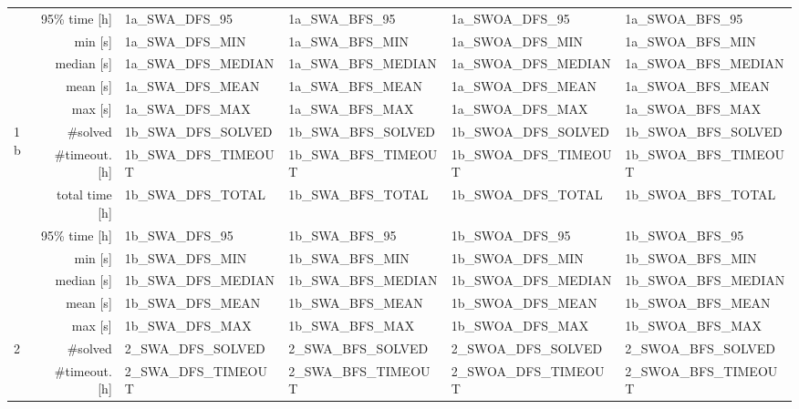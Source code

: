 \begin{table}
{{\begin{tabular}{|l|r|l|l|l|l|}
                      & 95\% time [h]  & 1a_SWA_DFS_95         & 1a_SWA_BFS_95         & 1a_SWOA_DFS_95        & 1a_SWOA_BFS_95         \\
\cline{2-6}
                      & min [s]        & 1a_SWA_DFS_MIN        & 1a_SWA_BFS_MIN        & 1a_SWOA_DFS_MIN       & 1a_SWOA_BFS_MIN        \\
                      & median [s]     & 1a_SWA_DFS_MEDIAN     & 1a_SWA_BFS_MEDIAN     & 1a_SWOA_DFS_MEDIAN    & 1a_SWOA_BFS_MEDIAN     \\
                      & mean [s]       & 1a_SWA_DFS_MEAN       & 1a_SWA_BFS_MEAN       & 1a_SWOA_DFS_MEAN      & 1a_SWOA_BFS_MEAN       \\
                      & max [s]        & 1a_SWA_DFS_MAX        & 1a_SWA_BFS_MAX        & 1a_SWOA_DFS_MAX       & 1a_SWOA_BFS_MAX        \\
\hline
\hline
\multirow{8}{*}{1b}   & \#solved & 1b_SWA_DFS_SOLVED    & 1b_SWA_BFS_SOLVED    & 1b_SWOA_DFS_SOLVED   & 1b_SWOA_BFS_SOLVED    \\
                      & \#timeout. [h] & 1b_SWA_DFS_TIMEOUT    & 1b_SWA_BFS_TIMEOUT    & 1b_SWOA_DFS_TIMEOUT   & 1b_SWOA_BFS_TIMEOUT    \\
                      & total time [h] & 1b_SWA_DFS_TOTAL      & 1b_SWA_BFS_TOTAL      & 1b_SWOA_DFS_TOTAL     & 1b_SWOA_BFS_TOTAL      \\
                      & 95\% time [h]  & 1b_SWA_DFS_95         & 1b_SWA_BFS_95         & 1b_SWOA_DFS_95        & 1b_SWOA_BFS_95         \\
\cline{2-6}
                      & min [s]        & 1b_SWA_DFS_MIN        & 1b_SWA_BFS_MIN        & 1b_SWOA_DFS_MIN       & 1b_SWOA_BFS_MIN        \\
                      & median [s]     & 1b_SWA_DFS_MEDIAN     & 1b_SWA_BFS_MEDIAN     & 1b_SWOA_DFS_MEDIAN    & 1b_SWOA_BFS_MEDIAN     \\
                      & mean [s]       & 1b_SWA_DFS_MEAN       & 1b_SWA_BFS_MEAN       & 1b_SWOA_DFS_MEAN      & 1b_SWOA_BFS_MEAN       \\
                      & max [s]        & 1b_SWA_DFS_MAX        & 1b_SWA_BFS_MAX        & 1b_SWOA_DFS_MAX       & 1b_SWOA_BFS_MAX        \\
\hline
\hline
\multirow{8}{*}{2}    & \#solved & 2_SWA_DFS_SOLVED     & 2_SWA_BFS_SOLVED     & 2_SWOA_DFS_SOLVED    & 2_SWOA_BFS_SOLVED     \\
                      & \#timeout. [h] & 2_SWA_DFS_TIMEOUT     & 2_SWA_BFS_TIMEOUT     & 2_SWOA_DFS_TIMEOUT    & 2_SWOA_BFS_TIMEOUT     \\

\end{tabular}}}
\end{table}
